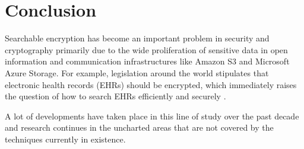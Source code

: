 \documentclass[12pt,a4paper]{article}
\theoremstyle{definition}
\begin{document}
\section{Conclusion}
Searchable encryption has become an important problem in security and
cryptography primarily due to the wide proliferation of sensitive data
in open information and communication infrastructures like Amazon S3 and
Microsoft Azure Storage. For example, legislation around the world
stipulates that electronic health records (EHRs) should be encrypted,
which immediately raises the question of how to search EHRs efficiently
and securely \cite{Bosch}.

A lot of developments have taken place in this line of study over the
past decade and research continues in the uncharted areas that are not
covered by the techniques currently in existence.

\clearpage
\nocite{*}
\printbibliography
\end{document}
